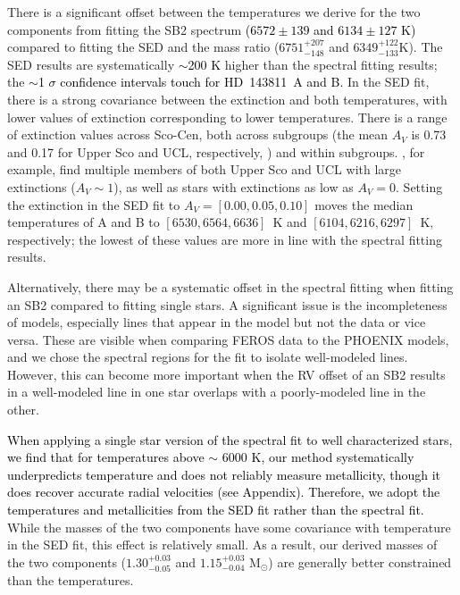 \documentclass[]{aastex701} %
\begin{document}
There is a significant offset between the temperatures we derive for the two components from fitting the SB2 spectrum \textcolor{black}{($6572 \pm 139$ and $6134 \pm 127$ K)} compared to fitting the SED and the mass ratio ($6751^{+207}_{-148}$ and $6349^{+122}_{-133}$K). The SED results are systematically \textcolor{black}{$\sim$200 K} higher than the spectral fitting results; the  \textcolor{black}{$\sim$1 $\sigma$ confidence intervals touch for HD~143811~A and B.} In the SED fit, there is a strong covariance between the extinction and both temperatures, with lower values of extinction corresponding to lower temperatures. There is a range of extinction values across Sco-Cen, both across subgroups (the mean $A_V$ is 0.73 and 0.17 for Upper Sco and UCL, respectively, \citealt{degeus:1989,wright:2018}) and within subgroups. \citet{pecaut:2016}, for example, find multiple members of both Upper Sco and UCL with large extinctions ($A_V \sim 1$), as well as stars with extinctions as low as $A_V = 0$. Setting the extinction in the SED fit to $A_V = [0.00, 0.05, 0.10]$ moves the median temperatures of A and B to $[6530,6564,6636]$~K and $[6104,6216,6297]$~K, respectively; the lowest of these values are more in line with the spectral fitting results. 

Alternatively, there may be a systematic offset in the spectral fitting when fitting an SB2 compared to fitting single stars. A significant issue is the incompleteness of models, especially lines that appear in the model but not the data or vice versa. These are visible when comparing FEROS data to the PHOENIX models, and we chose the spectral regions for the fit to isolate well-modeled lines. However, this can become more important when the RV offset of an SB2 results in a well-modeled line in one star overlaps with a poorly-modeled line in the other.

\textcolor{black}{When applying a single star version of the spectral fit to well characterized stars, we find that for temperatures above $\sim$ 6000 K, our method systematically underpredicts temperature and does not reliably measure metallicity, though it does recover accurate radial velocities (see Appendix). Therefore, we adopt the temperatures and metallicities from the SED fit rather than the spectral fit.} While the masses of the two components have some covariance with temperature in the SED fit, this effect is relatively small. As a result, our derived masses of the two components ($1.30^{+0.03}_{-0.05}$ and $1.15^{+0.03}_{-0.04}$ M$_\odot$) are generally better constrained than the temperatures.
\end{document}

